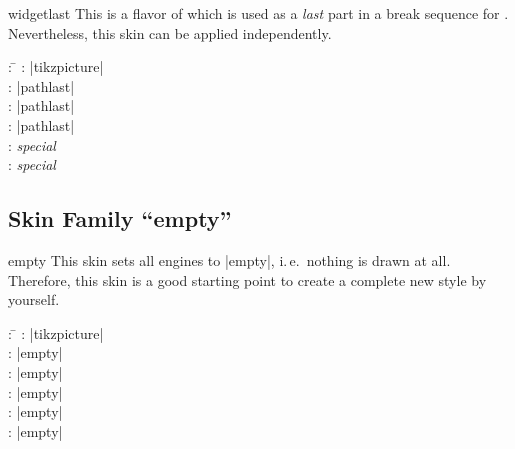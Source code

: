 \begin{dispExample}
\end{dispExample}


\clearpage
\begin{docSkin}{widgetlast}
This is a flavor of  which is used as a \emph{last} part
in a break sequence for .
Nevertheless, this skin can be applied independently.
\begin{tcolorbox}[skintable=widgetlast]
  \begin{tabbing}
    : \=\kill
    :  \> |tikzpicture|\\ 
    :           \> |pathlast|\\
    : \> |pathlast|\\ 
    :        \> |pathlast|\\
    :    \> \emph{special}\\
    :           \> \emph{special}
  \end{tabbing}
\end{tcolorbox}
\end{docSkin}


\begin{dispExample}
\end{dispExample}


\clearpage
\subsection{Skin Family \enquote{empty}}

\begin{docSkin}{empty}
  This skin sets all engines to |empty|, i.\,e.\ nothing is drawn at all.
  Therefore, this skin is a good starting point to create a complete
  new style by yourself.
\begin{tcolorbox}[skintable=empty]
  \begin{tabbing}
    : \=\kill
    :  \> |tikzpicture|\\ 
    :           \> |empty|\\
    : \> |empty|\\ 
    :        \> |empty|\\
    :    \> |empty|\\
    :           \> |empty|
  \end{tabbing}
\end{tcolorbox}
\end{docSkin}


